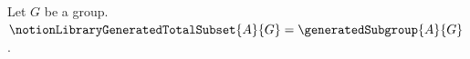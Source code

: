 

\begin{definition}\label{notion_library_generated_total_subset}
    Let $G$ be a group.
    $\notionLibraryGeneratedTotalSubset{A}{G}=\generatedSubgroup{A}{G}$.
\end{definition}

